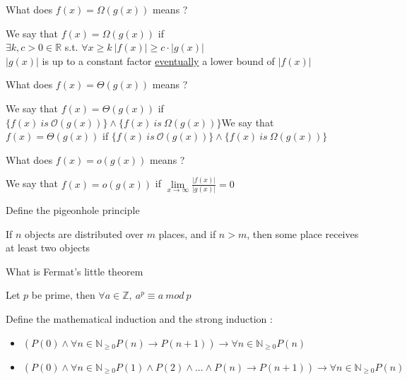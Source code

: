 \documentclass[12pt]{article}
\newcommand*{\xfield}[1]{\begin{mdframed}\centering #1\end{mdframed}\bigskip}
\newenvironment{note}{}{}
\begin{document}
\begin{note}
    \xfield{What does $f(x) = \Omega(g(x))$ means ?}
    \xfield{
        We say that  $f(x) = \Omega(g(x))$ if \\
        $\exists k,c > 0 \in \mathbb{R}$ s.t. $\forall x \ge k\ \left\vert f(x)\right\vert \ge c \cdot \left\vert g(x)\right\vert $ \\
        $\left\vert g(x)\right\vert$ is up to a constant factor \underline{eventually} a lower bound of $\left\vert f(x)\right\vert $
    }
\end{note}

\begin{note}
    \xfield{What does $f(x) = \Theta(g(x))$ means ?}
    \xfield{We say that $f(x) = \Theta(g(x))$ if $\{f(x)\ is\ \mathcal{O}(g(x))\} \wedge \{f(x)\ is\ \Omega (g(x))\}$We say that $f(x) = \Theta(g(x))$ if $\{f(x)\ is\ \mathcal{O}(g(x))\} \wedge \{f(x)\ is\ \Omega (g(x))\}$}
\end{note}

\begin{note}
    \xfield{What does $f(x) = o(g(x))$ means ?}
    \xfield{We say that $f(x) = o(g(x))$ if $\lim\limits_{x \to \infty} \frac{\left\vert f(x) \right\vert}{\left\vert g(x) \right\vert} = 0$}
\end{note}

\begin{note}
	\xfield{Define the pigeonhole principle}
	\xfield{If $n$ objects are distributed over $m$ places, and if $n > m$, then some place receives at least two objects}
\end{note}

\begin{note}
	\xfield{What is Fermat's little theorem}
	\xfield{Let $p$ be prime, then $\forall a \in \mathbb{Z},\ a^p \equiv a\ mod\ p$}
\end{note}

\begin{note}
	\xfield{}
	\xfield{}
\end{note}

\begin{note}
	\xfield{Define the mathematical induction and the strong induction :}
	\xfield{\begin{itemize}
		\item $(P(0) \wedge \forall n \in \mathbb{N}_{\ge 0} P(n) \rightarrow P(n+1)) \rightarrow \forall n \in \mathbb{N}_{\ge 0} P(n)$
		\item $(P(0) \wedge \forall n \in \mathbb{N}_{\ge 0} P(1) \wedge P(2)\wedge ... \wedge P(n) \rightarrow P(n+1)) \rightarrow \forall n \in \mathbb{N}_{\ge 0} P(n)$
	\end{itemize} }
\end{note}
\end{document}
